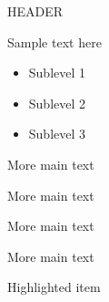 \documentclass{beamer}
\begin{document}
	\begin{frame}{HEADER}
		\begin{vfilleditems}
			\item Sample text here
			\begin{itemize}
				\item Sublevel 1
				\item Sublevel 2
				\item Sublevel 3
			\end{itemize}
			\item More main text
			\item More main text
			\item More main text
			\item More main text
			\item \alert{Highlighted item}
		\end{vfilleditems}
	\end{frame}
	
\end{document}
